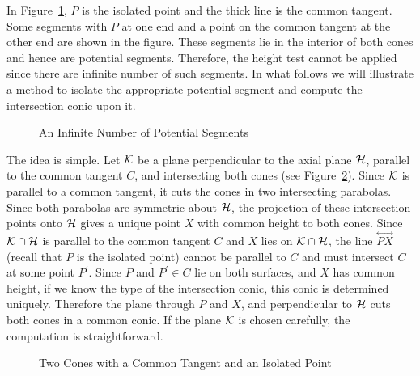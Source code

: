      In Figure~\ref{fig:infinite}, $P$ is the isolated point and the thick line
is the common tangent.  Some segments with $P$ at one end and a point on the 
common tangent at the other end are shown in the figure.  These segments lie in
the interior of both cones and hence are potential segments.  Therefore, the 
height test cannot be applied since there are infinite number of such segments.
In what follows we will illustrate a method to isolate the appropriate 
potential segment and compute the intersection conic upon it.
\begin{figure}
\vspace{4.5cm}
\caption{An Infinite Number of Potential Segments}
\label{fig:infinite}
\end{figure}

     The idea is simple.  Let ${\cal K}$ be a plane perpendicular to the axial
plane ${\cal H}$, parallel to the common tangent $C$, and intersecting both 
cones (see Figure~\ref{fig:proof-idea}).  Since ${\cal K}$ is parallel to a 
common tangent, it cuts the cones in two intersecting parabolas.  Since both 
parabolas are symmetric about ${\cal H}$, the projection of these intersection
points onto ${\cal H}$ gives a unique point $X$ with common height to both 
cones.  Since ${\cal K}\cap{\cal H}$ is parallel to the
common tangent $C$ and $X$ lies on ${\cal K}\cap{\cal H}$, the line 
$\stackrel{\longleftrightarrow}{PX}$ (recall that $P$ is the isolated point)
cannot be parallel to $C$ and must intersect $C$ at some point $P^\prime$.
Since $P$ and $P^\prime\in C$ lie on both surfaces, 
and $X$ has common height, if we know the type 
of the intersection conic, this conic is determined uniquely.  Therefore the 
plane through $P$ and $X$, and perpendicular to ${\cal H}$ cuts both cones in 
a common conic.  If the plane ${\cal K}$ is chosen carefully, the computation 
is straightforward.
\begin{figure}
\vspace{5cm}
\caption{Two Cones with a Common Tangent and an Isolated Point}
\label{fig:proof-idea}
\end{figure}

